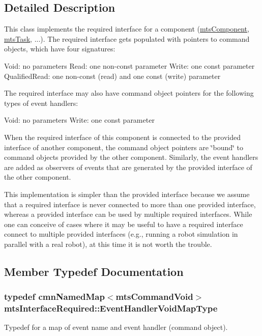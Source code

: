 \subsection{Detailed Description}
This class implements the required interface for a component (\hyperlink{classmts_component}{mts\+Component}, \hyperlink{classmts_task}{mts\+Task}, ...). The required interface gets populated with pointers to command objects, which have four signatures\+:

Void\+: no parameters Read\+: one non-\/const parameter Write\+: one const parameter Qualified\+Read\+: one non-\/const (read) and one const (write) parameter

The required interface may also have command object pointers for the following types of event handlers\+:

Void\+: no parameters Write\+: one const parameter

When the required interface of this component is connected to the provided interface of another component, the command object pointers are \char`\"{}bound\char`\"{} to command objects provided by the other component. Similarly, the event handlers are added as observers of events that are generated by the provided interface of the other component.

This implementation is simpler than the provided interface because we assume that a required interface is never connected to more than one provided interface, whereas a provided interface can be used by multiple required interfaces. While one can conceive of cases where it may be useful to have a required interface connect to multiple provided interfaces (e.\+g., running a robot simulation in parallel with a real robot), at this time it is not worth the trouble. 

\subsection{Member Typedef Documentation}
\hypertarget{classmts_interface_required_a1f6cca73d8dffb794e3778092b375783}{}
\subsubsection[{Event\+Handler\+Void\+Map\+Type}]{\setlength{\rightskip}{0pt plus 5cm}typedef {\bf cmn\+Named\+Map}$<${\bf mts\+Command\+Void}$>$ {\bf mts\+Interface\+Required\+::\+Event\+Handler\+Void\+Map\+Type}\hspace{0.3cm}{\ttfamily [protected]}}\label{classmts_interface_required_a1f6cca73d8dffb794e3778092b375783}
Typedef for a map of event name and event handler (command object). \hypertarget{classmts_interface_required_a8ea82ecaf05dc0aca4595ac685b8a43f}{}
